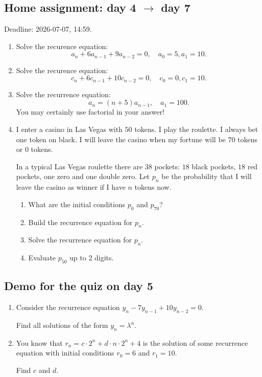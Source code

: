 \documentclass[12pt]{article}
\begin{document}
\subsection*{Home assignment: day 4 $\to$ day 7}

Deadline: 2026-07-07, 14:59. 

\begin{enumerate}
    \item Solve the recurence equation:
    \[
    a_n + 6 a_{n-1} + 9 a_{n-2} = 0, \quad a_0 = 5, a_1 = 10.
    \]
    \item Solve the recurence equation:
    \[
    c_n + 6 c_{n-1} + 10 c_{n-2} = 0, \quad c_0 = 0, c_1 = 10.
    \]
    \item Solve the recurrence equation: 
    \[
    a_n = (n + 5) a_{n-1}, \quad a_1 = 100.
    \]
    You may certainly use factorial in your answer! 
    \item I enter a casino in Las Vegas with $50$ tokens. I play the roulette.
I always bet one token on black. I will leave the casino when my fortune will be $70$ tokens or $0$ tokens. 

In a typical Las Vegas roulette there are $38$ pockets: $18$ black pockets, $18$ red pockets, one zero and one double zero.
Let $p_n$ be the probability that I will leave the casino as winner if I have $n$ tokens now. 
\begin{enumerate}[label=\alph*)]
    \item What are the initial conditions $p_0$ and $p_{70}$?
    \item Build the recurrence equation for $p_n$. 
    \item Solve the recurrence equation for $p_n$.
    \item Evaluate $p_{50}$ up to $2$ digits. 
\end{enumerate}
\end{enumerate}

\subsection*{Demo for the quiz on day 5}

\begin{enumerate} 
    \item Consider the recurrence equation $y_n - 7 y_{n-1} + 10 y_{n-2} = 0$.
    
    Find all solutions of the form $y_n = \lambda^n$.
    \item You know that $r_n = c \cdot 2^n + d \cdot n \cdot 2^n + 4$ is the solution of some recurrence equation with initial conditions  $r_0 = 6$ and $r_1 = 10$.
    
    Find $c$ and $d$. 
\end{enumerate}
\end{document}

